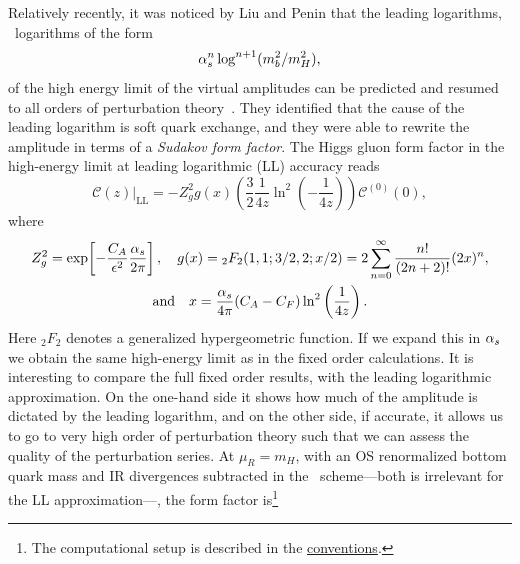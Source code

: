 Relatively recently, it was noticed by Liu and Penin that the leading logarithms, \ie\ logarithms of the form
\begin{equation}
\alpha_s^n \log^{n + 1} (m_b^2/m_H^2),
\end{equation}
of the high energy limit of the virtual amplitudes can be predicted and resumed to all orders of perturbation theory~\cite{Liu:2017vkm}. They identified that the cause of the leading logarithm is soft quark exchange, and they were able to rewrite the amplitude in terms of a \textit{Sudakov form factor}. The Higgs gluon form factor in the high-energy limit at leading logarithmic (\acs{LL}) accuracy reads
\begin{equation}
\mathcal{C}(z) \bigg \vert_{\text{LL}} = - Z_g^2 g(x) \left(\frac{3}{2} \frac{1}{4z} \ln^2 \left(-\frac{1}{4z} \right) \right) \mathcal{C}^{(0)}(0),
\end{equation}
where
\begin{equation}
\begin{gathered}
Z_g^2 = \exp\! \left[- \frac{C_A}{\epsilon^2} \frac{\alpha_s}{2 \pi} \right], \quad g(x) = {}_2F_2(1, 1;3/2,2;x/2) = 2 \sum_{n = 0}^\infty \frac{n!}{(2 n + 2)!} (2 x)^{n}, \\
\text{and} \quad x = \frac{\alpha_s}{4 \pi} (C_A - C_F) \ln^2\left(\frac{1}{4 z} \right).
\end{gathered}
\end{equation}
Here ${}_2F_{2}$ denotes a generalized hypergeometric function. If we expand this in $\alpha_s$ we obtain the same high-energy limit as in the fixed order calculations. It is interesting to compare the full fixed order results, with the leading logarithmic approximation. On the one-hand side it shows how much of the amplitude is dictated by the leading logarithm, and on the other side, if accurate, it allows us to go to very high order of perturbation theory such that we can assess the quality of the perturbation series. At $\mu_R = m_H$, with an \acs{OS} renormalized bottom quark mass and \acs{IR} divergences subtracted in the \MS\ scheme---both is irrelevant for the \acs{LL} approximation---, the form factor is\footnote{The computational setup is described in the \hyperref[chap:notation_and_conventions]{conventions}.}
